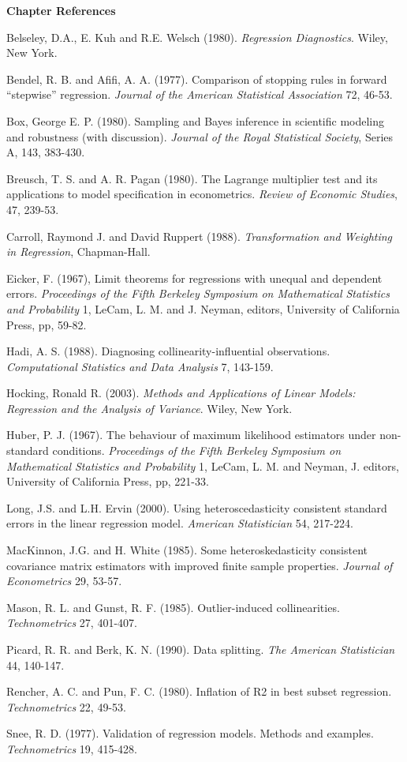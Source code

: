 \textbf{Chapter References}
\begin{multicols}{2}

Belseley, D.A., E. Kuh and R.E. Welsch (1980). \textit{Regression
Diagnostics}. Wiley, New York.

Bendel, R. B. and Afifi, A. A. (1977). Comparison of stopping rules
in forward ``stepwise'' regression. \textit{Journal of the American
Statistical Association} 72, 46-53.

Box, George E. P. (1980). Sampling and Bayes inference in scientific
modeling and robustness (with discussion). \textit{Journal of the
Royal Statistical Society}, Series A, 143, 383-430.

Breusch, T. S. and A. R. Pagan (1980).  The Lagrange multiplier test
and its applications to model specification in econometrics.
\textit{Review of Economic Studies}, 47, 239-53.

Carroll, Raymond J. and David Ruppert (1988). \textit{Transformation
and Weighting in Regression}, Chapman-Hall.

Eicker, F. (1967), Limit theorems for regressions with unequal and
dependent errors.  \textit{Proceedings of the Fifth Berkeley
Symposium on Mathematical Statistics and Probability} 1, LeCam, L.
M. and J. Neyman, editors, University of California Press, pp,
59-82.

Hadi, A. S. (1988). Diagnosing collinearity-influential
observations. \textit{Computational Statistics and Data Analysis} 7,
143-159.

Hocking, Ronald R. (2003). \textit{Methods and Applications of
Linear Models: Regression and the Analysis of Variance}. Wiley, New
York.

Huber, P. J. (1967). The behaviour of maximum likelihood estimators
under non-standard conditions. \textit{Proceedings of the Fifth
Berkeley Symposium on Mathematical Statistics and Probability} 1,
LeCam, L. M. and Neyman, J. editors, University of California Press,
pp, 221-33.

Long, J.S. and L.H. Ervin (2000). Using heteroscedasticity
consistent standard errors in the linear regression model.
\textit{American Statistician} 54, 217-224.

MacKinnon, J.G. and H. White (1985). Some heteroskedasticity
consistent covariance matrix estimators with improved finite sample
properties. \textit{Journal of Econometrics} 29, 53-57.

Mason, R. L. and Gunst, R. F. (1985). Outlier-induced
collinearities. \textit{Technometrics} 27, 401-407.

Picard, R. R. and Berk, K. N. (1990). Data splitting. \textit{The
American Statistician} 44, 140-147.

Rencher, A. C. and Pun, F. C. (1980). Inflation of R2 in best subset
regression. \textit{Technometrics} 22, 49-53.

Snee, R. D. (1977). Validation of regression models. Methods and
examples. \textit{Technometrics} 19, 415-428.


\end{multicols}


